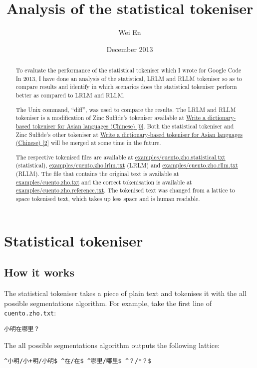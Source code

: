 \documentclass{article}
\title{Analysis of the statistical tokeniser}
\author{Wei En}
\date{December 2013}
\begin{document}
\begin{abstract}
To evaluate the performance of the statistical tokeniser which I wrote
for Google Code In 2013, I have done an analysis of the statistical,
LRLM and RLLM tokeniser so as to compare results and identify in which
scenarios does the statistical tokeniser perform better as compared to
LRLM and RLLM.

The Unix command, ``diff'', was used to compare the results. The LRLM
and RLLM tokeniser is a modification of Zinc Sulfide's tokeniser
available at
\href{https://google-melange.appspot.com/gci/task/view/google/gci2013/5458470983696384}{Write
a dictionary-based tokeniser for Asian languages (Chinese) {[}0{]}}.
Both the statistical tokeniser and Zinc Sulfide's other tokeniser at
\href{https://google-melange.appspot.com/gci/task/view/google/gci2013/6337672264024064}{Write
a dictionary-based tokeniser for Asian languages (Chinese) {[}2{]}} will
be merged at some time in the future.

The respective tokenised files are available at
\url{examples/cuento.zho.statistical.txt} (statistical),
\url{examples/cuento.zho.lrlm.txt} (LRLM) and
\url{examples/cuento.zho.rllm.txt} (RLLM). The file that contains the
original text is available at \url{examples/cuento.zho.txt} and the
correct tokenisation is available at
\url{examples/cuento.zho.reference.txt}. The tokenised text was changed
from a lattice to space tokenised text, which takes up less space and is
human readable.
\end{abstract}

\section{Statistical tokeniser}

\subsection{How it works}

The statistical tokeniser takes a piece of plain text and tokenises it
with the all possible segmentations algorithm. For example, take the
first line of \texttt{cuento.zho.txt}:

\begin{verbatim}
小明在哪里？
\end{verbatim}

The all possible segmentations algorithm outputs the following lattice:

\begin{verbatim}
^小明/小+明/小明$ ^在/在$ ^哪里/哪里$ ^？/*？$
\end{verbatim}
\end{document}
